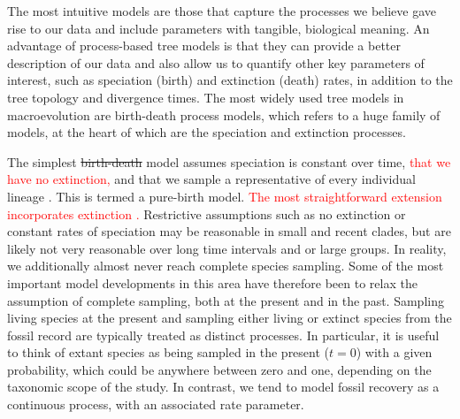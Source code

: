 \documentclass[11pt]{article}
\newcommand{\edit}[1]{{\textcolor{red}{#1}}} %
\begin{document}
The most intuitive models are those that capture the processes we believe gave rise to our data and include parameters with tangible, biological meaning.
An advantage of process-based tree models is that they can provide a better description of our data and also allow us to quantify other key parameters of interest, such as speciation (birth) and extinction (death) rates, in addition to the tree topology and divergence times. %
The most widely used tree models in macroevolution are birth-death process models, which refers to a huge family of models, at the heart of which are the speciation and extinction processes. 

The simplest \sout{birth-death} model assumes speciation is constant over time, \edit{that we have no extinction,} and that we sample a representative of every individual lineage \cite{Yule1925}.
This is termed a pure-birth model.
\edit{The most straightforward extension incorporates  extinction \cite{Kendall1948}.}
Restrictive assumptions such as no extinction or constant rates of speciation may be reasonable in small and recent clades, but are likely not very reasonable over long time intervals and or large groups.
In reality, we additionally almost never reach complete species sampling.
Some of the most important model developments in this area have therefore been to relax the assumption of complete sampling, both at the present and in the past.
Sampling living species at the present and sampling either living or extinct species from the fossil record are typically treated as distinct processes.
In particular, it is useful to think of extant species as being sampled in the present ($t=0$) with a given probability, which could be anywhere between zero and one, depending on the taxonomic scope of the study.
In contrast, we tend to model fossil recovery as a continuous process, with an associated rate parameter.  
\end{document}
